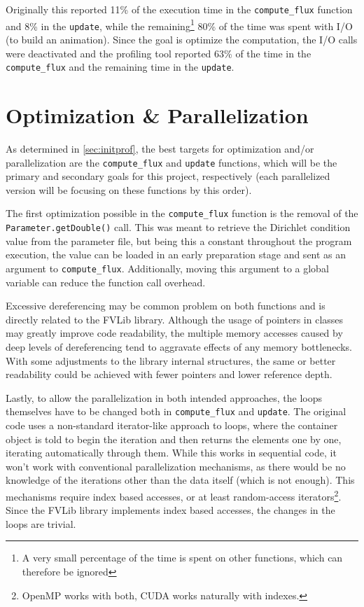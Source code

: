 \documentclass[9pt,twocolumn]{scrartcl}
\begin{document}
Originally this reported 11\% of the execution time in the \texttt{compute\_flux} function and 8\% in the \texttt{update}, while the remaining\footnote{A very small percentage of the time is spent on other functions, which can therefore be ignored} 80\% of the time was spent with I/O (to build an animation). Since the goal is optimize the computation, the I/O calls were deactivated and the profiling tool reported 63\% of the time in the \texttt{compute\_flux} and the remaining time in the \texttt{update}.

\section{Optimization \& Parallelization}
\label{sec:optm&para}
As determined in \autoref{sec:initprof}, the best targets for optimization and/or parallelization are the \texttt{compute\_flux} and \texttt{update} functions, which will be the primary and secondary goals for this project, respectively (each parallelized version will be focusing on these functions by this order).

The first optimization possible in the \texttt{compute\_flux} function is the removal of the \texttt{Parameter.getDouble()} call. This was meant to retrieve the Dirichlet condition value from the parameter file, but being this a constant throughout the program execution, the value can be loaded in an early preparation stage and sent as an argument to \texttt{compute\_flux}. Additionally, moving this argument to a global variable can reduce the function call overhead.

Excessive dereferencing may be common problem on both functions and is directly related to the FVLib library. Although the usage of pointers in classes may greatly improve code readability, the multiple memory accesses caused by deep levels of dereferencing tend to aggravate effects of any memory bottlenecks. With some adjustments to the library internal structures, the same or better readability could be achieved with fewer pointers and lower reference depth.

Lastly, to allow the parallelization in both intended approaches, the loops themselves have to be changed both in \texttt{compute\_flux} and \texttt{update}. The original code uses a non-standard iterator-like approach to loops, where the container object is told to begin the iteration and then returns the elements one by one, iterating automatically through them. While this works in sequential code, it won't work with conventional parallelization mechanisms, as there would be no knowledge of the iterations other than the data itself (which is not enough). This mechanisms require index based accesses, or at least random-access iterators\footnote{OpenMP works with both, CUDA works naturally with indexes.}. Since the FVLib library implements index based accesses, the changes in the loops are trivial.
\end{document}
